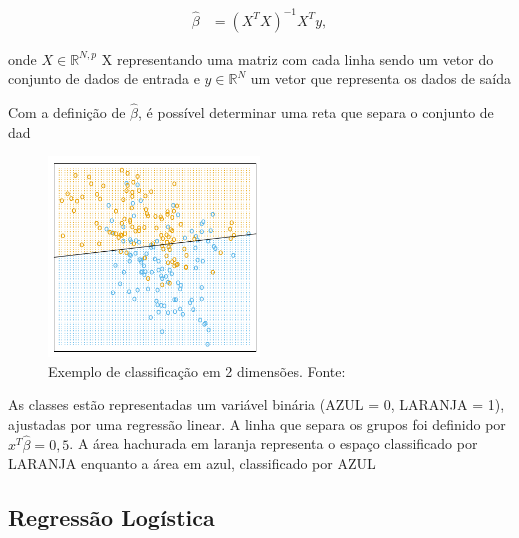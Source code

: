 \begin{equation}
  \label{eq:solucao_minimos_quadrados}
  \begin{aligned}
\hat{\beta} &= (X^{T}X)^{-1}X^{T}y, 
  \end{aligned}  
\end{equation}

onde \begin{math} X \in \mathbb{R}^{N,p} \end{math} X representando uma matriz com cada linha sendo um vetor do conjunto de dados de entrada e \begin{math}y \in \mathbb{R}^{N}\end{math} um vetor que representa os dados de saída \footnotemark {}

Com a definição de \begin{math}\hat{\beta}\end{math}, é possível determinar uma reta que separa o conjunto de dad

\begin{figure}[!ht]
\centerline{\includegraphics[width=0.5\textwidth]{img/hiperplano}}
\caption{Exemplo de classificação em 2 dimensões. Fonte: \cite{HASTIE}}
\end{figure}



 As classes estão representadas um variável binária (AZUL = 0, LARANJA = 1), ajustadas por uma regressão linear. A linha que separa os grupos foi definido por \begin{math}x^{T}\hat{\beta} = 0,5\end{math}. A área hachurada em laranja representa o espaço classificado por LARANJA enquanto a área em azul, classificado por AZUL

\subsection{Regressão Logística}

